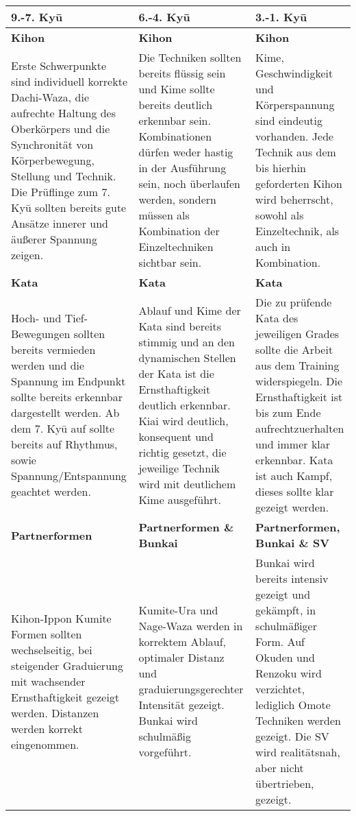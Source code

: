 	\null\vfill\null
	\begin{tabularx}{\linewidth}{XXX}
		9.-7. Ky\={u}	& 6.-4. Ky\={u}	& 3.-1. Ky\={u}\\
		\midrule
		{\footnotesize \textbf{Kihon}}&{\footnotesize \textbf{Kihon}}&{\footnotesize \textbf{Kihon}}\\
		{\footnotesize Erste Schwerpunkte sind individuell korrekte Dachi-Waza, die aufrechte Haltung des Oberkörpers und die Synchronität von Körperbewegung, Stellung und Technik. Die Prüflinge zum 7. Ky\={u} sollten bereits gute Ansätze innerer und äußerer Spannung zeigen.}&{\footnotesize Die Techniken sollten bereits flüssig sein und Kime sollte bereits deutlich erkennbar sein. Kombinationen dürfen weder hastig in der Ausführung sein, noch überlaufen werden, sondern müssen als Kombination der Einzeltechniken sichtbar sein.}&{\footnotesize Kime, Geschwindigkeit und Körperspannung sind eindeutig vorhanden. Jede Technik aus dem bis hierhin geforderten Kihon wird beherrscht, sowohl als Einzeltechnik, als auch in Kombination.}\\
		{\footnotesize \textbf{Kata}}&{\footnotesize \textbf{Kata}}&{\footnotesize \textbf{Kata}}\\
		{\footnotesize Hoch- und Tief-Bewegungen sollten bereits vermieden werden und die Spannung im Endpunkt sollte bereits erkennbar dargestellt werden. Ab dem 7. Ky\={u} auf sollte bereits auf Rhythmus, sowie Spannung/Entspannung geachtet werden.}&{\footnotesize Ablauf und Kime der Kata sind bereits stimmig und an den dynamischen Stellen der Kata ist die Ernsthaftigkeit deutlich erkennbar. Kiai wird deutlich, konsequent und richtig gesetzt, die jeweilige Technik wird mit deutlichem Kime ausgeführt.}&{\footnotesize Die zu prüfende Kata des jeweiligen Grades sollte die Arbeit aus dem Training widerspiegeln. Die Ernsthaftigkeit ist bis zum Ende aufrechtzuerhalten und immer klar erkennbar. Kata ist auch Kampf, dieses sollte klar gezeigt werden.}\\
		{\footnotesize \textbf{Partnerformen}}&{\footnotesize \textbf{Partnerformen \& Bunkai}}&{\footnotesize \textbf{Partnerformen, Bunkai \& SV}}\\
		{\footnotesize Kihon-Ippon Kumite Formen sollten wechselseitig, bei steigender Graduierung mit wachsender Ernsthaftigkeit gezeigt werden. Distanzen werden korrekt eingenommen.}&{\footnotesize Kumite-Ura und Nage-Waza werden in korrektem Ablauf, optimaler Distanz und graduierungsgerechter Intensität gezeigt. Bunkai wird schulmäßig vorgeführt.}&{\footnotesize Bunkai wird bereits intensiv gezeigt und gekämpft, in schulmäßiger Form. Auf Okuden und Renzoku wird verzichtet, lediglich Omote Techniken werden gezeigt. Die SV wird realitätsnah, aber nicht übertrieben, gezeigt.}\\
	\end{tabularx}\null\vfill\null
	\setlength{\tabcolsep}{6pt}